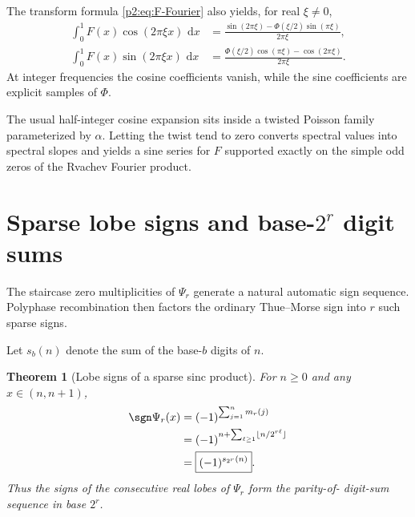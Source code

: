 \documentclass[11pt,oneside]{article}
\newtheorem{theorem}{Theorem}[section]
\theoremstyle{definition}
\newcommand{\dd}{\,\mathrm d}
\begin{document}
The transform formula \eqref{p2:eq:F-Fourier} also yields, for real $\xi\ne0$,
\begin{align}
 \int_0^1F(x)\cos(2\pi\xi x)\,\dd x
 &=\frac{\sin(2\pi\xi)-\Phi(\xi/2)\sin(\pi\xi)}{2\pi\xi}, \label{p2:eq:F-cos-transform}\\
 \int_0^1F(x)\sin(2\pi\xi x)\,\dd x
 &=\frac{\Phi(\xi/2)\cos(\pi\xi)-\cos(2\pi\xi)}{2\pi\xi}. \label{p2:eq:F-sin-transform}
\end{align}
At integer frequencies the cosine coefficients vanish, while the sine
coefficients are explicit samples of $\Phi$.

\begin{resultbox}
The usual half-integer cosine expansion sits inside a twisted Poisson family
parameterized by $\alpha$.  Letting the twist tend to zero converts spectral
values into spectral slopes and yields a sine series for $F$ supported exactly
on the simple odd zeros of the Rvachev Fourier product.
\end{resultbox}

\section{Sparse lobe signs and base-\texorpdfstring{$2^r$}{2-to-the-r} digit sums}
\label{p2:sec:sparse-signs}

The staircase zero multiplicities of $\Psi_r$ generate a natural automatic
sign sequence.  Polyphase recombination then factors the ordinary Thue--Morse
sign into $r$ such sparse signs.

Let $s_b(n)$ denote the sum of the base-$b$ digits of $n$.

\begin{theorem}[Lobe signs of a sparse sinc product]
\label{p2:thm:sparse-lobe-sign}
For $n\ge0$ and any $x\in(n,n+1)$,
\begin{align}
 \sgn\Psi_r(x)
 &=(-1)^{\sum_{j=1}^{n}m_r(j)}                             \label{p2:eq:sparse-sign-zero-count}\\
 &=(-1)^{n+\sum_{\ell\ge1}\lfloor n/2^{r\ell}\rfloor}    \label{p2:eq:sparse-sign-floor}\\
 &=\boxed{(-1)^{s_{2^r}(n)}}.                             \label{p2:eq:sparse-sign-base}
\end{align}
Thus the signs of the consecutive real lobes of $\Psi_r$ form the parity-of-
digit-sum sequence in base $2^r$.
\end{theorem}
\end{document}

